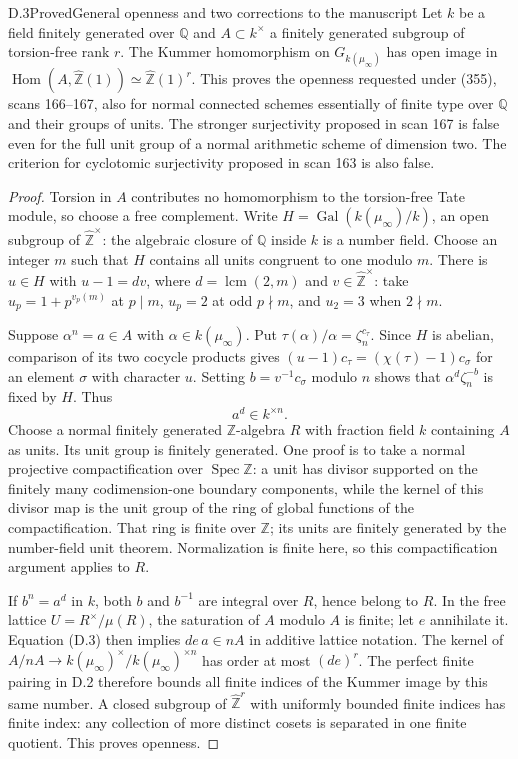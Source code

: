 \begin{statement}{D.3}{Proved}{General openness and two corrections to the manuscript}
Let $k$ be a field finitely generated over $\mathbb Q$ and $A\subset k^\times$ a finitely generated subgroup of torsion-free rank $r$. The Kummer homomorphism on $G_{k(\mu_\infty)}$ has open image in $\operatorname{Hom}(A,\widehat{\mathbb Z}(1))\simeq\widehat{\mathbb Z}(1)^r$. This proves the openness requested under (355), scans 166--167, also for normal connected schemes essentially of finite type over $\mathbb Q$ and their groups of units. The stronger surjectivity proposed in scan 167 is false even for the full unit group of a normal arithmetic scheme of dimension two. The criterion for cyclotomic surjectivity proposed in scan 163 is also false.
\end{statement}
\begin{proof}
Torsion in $A$ contributes no homomorphism to the torsion-free Tate module, so choose a free complement. Write $H=\operatorname{Gal}(k(\mu_\infty)/k)$, an open subgroup of $\widehat{\mathbb Z}^{\times}$: the algebraic closure of $\mathbb Q$ inside $k$ is a number field. Choose an integer $m$ such that $H$ contains all units congruent to one modulo $m$. There is $u\in H$ with $u-1=dv$, where $d=\operatorname{lcm}(2,m)$ and $v\in\widehat{\mathbb Z}^{\times}$: take $u_p=1+p^{v_p(m)}$ at $p\mid m$, $u_p=2$ at odd $p\nmid m$, and $u_2=3$ when $2\nmid m$.

Suppose $\alpha^n=a\in A$ with $\alpha\in k(\mu_\infty)$. Put $\tau(\alpha)/\alpha=\zeta_n^{c_\tau}$. Since $H$ is abelian, comparison of its two cocycle products gives
$(u-1)c_\tau=(\chi(\tau)-1)c_\sigma$ for an element $\sigma$ with character $u$. Setting $b=v^{-1}c_\sigma$ modulo $n$ shows that $\alpha^d\zeta_n^{-b}$ is fixed by $H$. Thus
\[
 a^d\in k^{\times n}.                                      \tag{D.3}
\]
Choose a normal finitely generated $\mathbb Z$-algebra $R$ with fraction field $k$ containing $A$ as units. Its unit group is finitely generated. One proof is to take a normal projective compactification over $\operatorname{Spec}\mathbb Z$: a unit has divisor supported on the finitely many codimension-one boundary components, while the kernel of this divisor map is the unit group of the ring of global functions of the compactification. That ring is finite over $\mathbb Z$; its units are finitely generated by the number-field unit theorem. Normalization is finite here, so this compactification argument applies to $R$.

If $b^n=a^d$ in $k$, both $b$ and $b^{-1}$ are integral over $R$, hence belong to $R$. In the free lattice $U=R^\times/\mu(R)$, the saturation of $A$ modulo $A$ is finite; let $e$ annihilate it. Equation (D.3) then implies $de\,a\in nA$ in additive lattice notation. The kernel of $A/nA\to k(\mu_\infty)^\times/k(\mu_\infty)^{\times n}$ has order at most $(de)^r$. The perfect finite pairing in D.2 therefore bounds all finite indices of the Kummer image by this same number. A closed subgroup of $\widehat{\mathbb Z}^r$ with uniformly bounded finite indices has finite index: any collection of more distinct cosets is separated in one finite quotient. This proves openness.


\end{proof}
